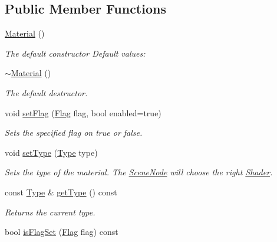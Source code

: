 \subsection*{Public Member Functions}
\begin{DoxyCompactItemize}
\item 
\hyperlink{classburn_1_1_material_a790cff05e96bd7956582777754a56a34}{Material} ()
\begin{DoxyCompactList}\small\item\em The default constructor Default values\-: \end{DoxyCompactList}\item 
\hyperlink{classburn_1_1_material_a449723d0d12182275e5d0d8a6a01f41d}{$\sim$\-Material} ()
\begin{DoxyCompactList}\small\item\em The default destructor. \end{DoxyCompactList}\item 
void \hyperlink{classburn_1_1_material_a833037afe81bc0aa52ceb4581b66087f}{set\-Flag} (\hyperlink{classburn_1_1_material_a704108f8bb133e1911495b84bd0826b8}{Flag} flag, bool enabled=true)
\begin{DoxyCompactList}\small\item\em Sets the specified flag on true or false. \end{DoxyCompactList}\item 
void \hyperlink{classburn_1_1_material_a287ad604c643dc76fc07d27b45ceecd2}{set\-Type} (\hyperlink{classburn_1_1_material_a2d219315cf05e59bbffe8e3831cc6c43}{Type} type)
\begin{DoxyCompactList}\small\item\em Sets the type of the material. The \hyperlink{classburn_1_1_scene_node}{Scene\-Node} will choose the right \hyperlink{classburn_1_1_shader}{Shader}. \end{DoxyCompactList}\item 
const \hyperlink{classburn_1_1_material_a2d219315cf05e59bbffe8e3831cc6c43}{Type} \& \hyperlink{classburn_1_1_material_a46b4ee518276ce465566b0fe8fdc169a}{get\-Type} () const 
\begin{DoxyCompactList}\small\item\em Returns the current type. \end{DoxyCompactList}\item 
bool \hyperlink{classburn_1_1_material_afa32027c9de752c96b74e08b3f1e42af}{is\-Flag\-Set} (\hyperlink{classburn_1_1_material_a704108f8bb133e1911495b84bd0826b8}{Flag} flag) const 

\end{DoxyCompactItemize}
